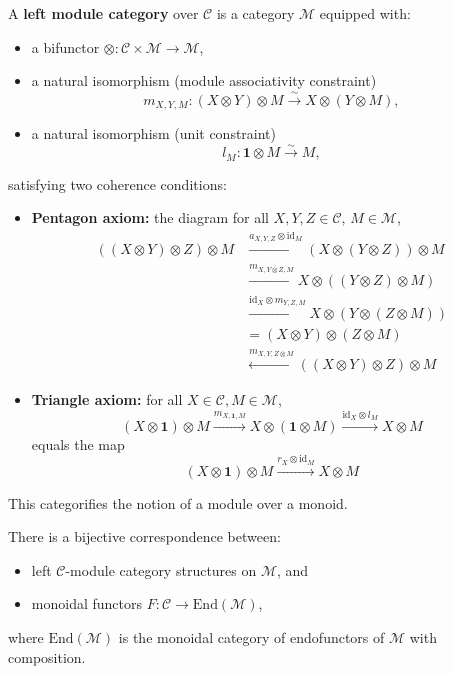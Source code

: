 \documentclass[11pt]{article}
\theoremstyle{definition}
\begin{document}
A \textbf{left module category} over \( \mathcal{C} \) is a category \( \mathcal{M} \) equipped with:
\begin{itemize}
  \item a bifunctor \( \otimes : \mathcal{C} \times \mathcal{M} \to \mathcal{M} \),
  \item a natural isomorphism (module associativity constraint)
  \[
  m_{X,Y,M} : (X \otimes Y) \otimes M \xrightarrow{\sim} X \otimes (Y \otimes M),
  \]
  \item a natural isomorphism (unit constraint)
  \[
  l_M : \mathbf{1} \otimes M \xrightarrow{\sim} M,
  \]
\end{itemize}

satisfying two coherence conditions:
\begin{itemize}
  \item \textbf{Pentagon axiom:} the diagram for all \( X,Y,Z \in \mathcal{C} \), \( M \in \mathcal{M} \),
  \[
  \begin{aligned}
  ((X \otimes Y) \otimes Z) \otimes M &\xrightarrow{a_{X,Y,Z} \otimes \mathrm{id}_M} (X \otimes (Y \otimes Z)) \otimes M \\
  &\xrightarrow{m_{X,Y \otimes Z,M}} X \otimes ((Y \otimes Z) \otimes M) \\
  &\xrightarrow{\mathrm{id}_X \otimes m_{Y,Z,M}} X \otimes (Y \otimes (Z \otimes M)) \\
  &= (X \otimes Y) \otimes (Z \otimes M) \\
  &\xleftarrow{m_{X,Y,Z \otimes M}} ((X \otimes Y) \otimes Z) \otimes M
  \end{aligned}
  \]

  \item \textbf{Triangle axiom:} for all \( X \in \mathcal{C}, M \in \mathcal{M} \),
  \[
  (X \otimes \mathbf{1}) \otimes M \xrightarrow{m_{X, \mathbf{1}, M}} X \otimes (\mathbf{1} \otimes M) \xrightarrow{\mathrm{id}_X \otimes l_M} X \otimes M
  \]
  equals the map
  \[
  (X \otimes \mathbf{1}) \otimes M \xrightarrow{r_X \otimes \mathrm{id}_M} X \otimes M
  \]
\end{itemize}

This categorifies the notion of a module over a monoid.

There is a bijective correspondence between:
\begin{itemize}
  \item left \( \mathcal{C} \)-module category structures on \( \mathcal{M} \), and
  \item monoidal functors \( F : \mathcal{C} \to \mathrm{End}(\mathcal{M}) \),
\end{itemize}
where \( \mathrm{End}(\mathcal{M}) \) is the monoidal category of endofunctors of \( \mathcal{M} \) with composition.
\end{document}
